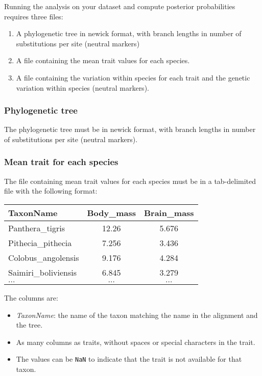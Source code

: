 \documentclass{article}
\begin{document}
Running the analysis on your dataset and compute posterior probabilities requires three files:

\begin{enumerate}
    \item A phylogenetic tree in newick format, with branch lengths in number of substitutions per site (neutral markers)
    \item A file containing the mean trait values for each species.
    \item A file containing the variation within species for each trait and the genetic variation within species (neutral markers).
\end{enumerate}

\subsubsection{Phylogenetic tree}\label{subsubsec:phylogenetic-tree}

The phylogenetic tree must be in newick format, with branch lengths in number of substitutions per site (neutral markers).

\subsubsection{Mean trait for each species}\label{subsubsec:mean-trait-for-each-species}

The file containing mean trait values for each species must be in a tab-delimited file with the following format:

\begin{table}[h]
    \centering
    \begin{tabular}{|l|c|c|}
        \hline
        TaxonName & Body\_mass & Brain\_mass \\
        \hline
        Panthera\_tigris & 12.26 & 5.676 \\
        Pithecia\_pithecia & 7.256 & 3.436 \\
        Colobus\_angolensis & 9.176 & 4.284 \\
        Saimiri\_boliviensis & 6.845 & 3.279 \\
        $\hdots$ & $\hdots$ & $\hdots$ \\
        \hline
    \end{tabular}\label{tab:trait-mean}
\end{table}

The columns are:

\begin{itemize}
    \item \emph{TaxonName}: the name of the taxon matching the name in the alignment and the tree.
    \item As many columns as traits, without spaces or special characters in the trait.
    \item The values can be \texttt{NaN} to indicate that the trait is not available for that taxon.
\end{itemize}
\end{document}
